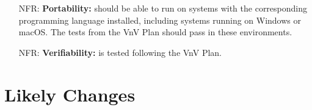 \documentclass[12pt]{article}
\newcounter{nfrnum} %
\begin{document}
\begin{itemize}
\item[NFR\refstepcounter{nfrnum}\thenfrnum \label{NFR_portability}:]
  \textbf{Portability:} \progname{} should be able to run on systems with the
  corresponding programming language
  installed, including systems running on Windows or macOS. The tests from
  the VnV Plan should pass in these environments.
  
\item[NFR\refstepcounter{nfrnum}\thenfrnum \label{NFR_verifiability}:]
  \textbf{Verifiability:} \progname{} is tested following the VnV Plan.


\end{itemize}

\section{Likely Changes} \label{sec_LCs}
\end{document}
